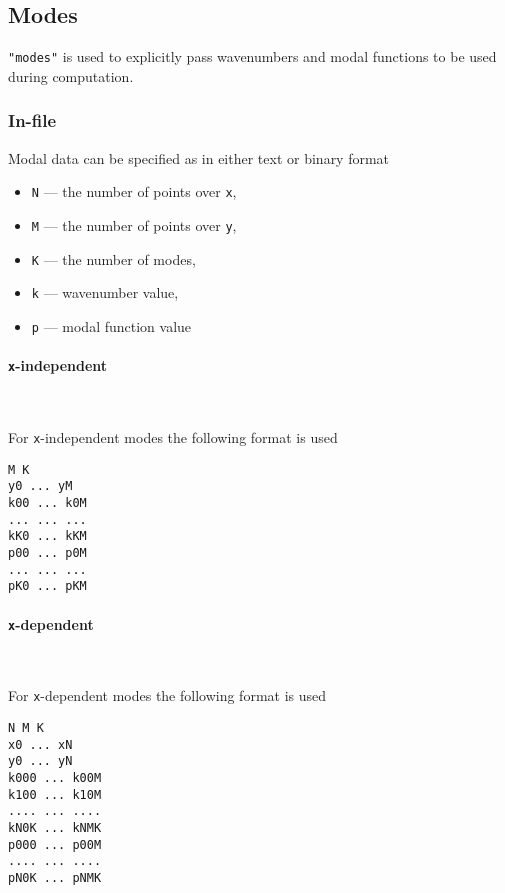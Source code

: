 \documentclass[12pt]{extarticle}
\newcommand{\code}[1]{\colorbox{gray!10}{\texttt{#1}}}
\begin{document}
        \subsection{Modes}
            \par \code{"modes"} is used to explicitly pass wavenumbers and modal functions to be used during computation.
            \subsubsection{In-file}
                \par Modal data can be specified as  in either text or binary format
                \begin{itemize}
                    \item\code{N} --- the number of points over \code{x},
                    \item\code{M} --- the number of points over \code{y},
                    \item\code{K} --- the number of modes,
                    \item\code{k} --- wavenumber value,
                    \item\code{p} --- modal function value
                \end{itemize}
                \paragraph{\code{x}-independent}~\\
                    \par For \code{x}-independent modes the following format is used
                    \begin{verbatim}
M K
y0 ... yM
k00 ... k0M
... ... ...
kK0 ... kKM
p00 ... p0M
... ... ...
pK0 ... pKM
                    \end{verbatim}
                \paragraph{\code{x}-dependent}~\\
                    \par For \code{x}-dependent modes the following format is used
                    \begin{verbatim}
N M K
x0 ... xN
y0 ... yN
k000 ... k00M
k100 ... k10M
.... ... ....
kN0K ... kNMK
p000 ... p00M
.... ... ....
pN0K ... pNMK
                    \end{verbatim}
\end{document}
